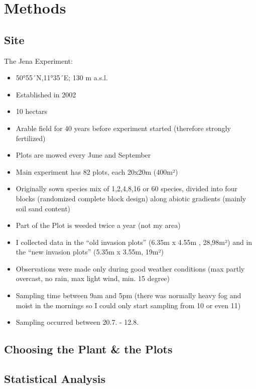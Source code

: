 \chapter{Methods}
\label{ch:methods}

\section{Site}

The Jena Experiment:

\begin{itemize}
\item	50°55´N,11°35´E; 130 m a.s.l.
\item	Established in 2002
\item	10 hectars
\item	Arable field for 40 years before experiment started (therefore strongly fertilized)
\item	Plots are mowed every June and September
\item	Main experiment has 82 plots, each 20x20m (400m²)
\item	Originally sown species mix of 1,2,4,8,16 or 60 species, divided into four blocks (randomized complete block design) along abiotic gradients (mainly soil sand content)
\item	Part of the Plot is weeded twice a year (not my area)
\item	I collected data in the “old invasion plots” (6.35m x 4.55m , 28,98m²) and in the “new invasion plots” (5.35m x 3.55m, 19m²)
\item	Observations were made only during good weather conditions (max partly overcast, no rain, max light wind, min. 15 degree)
\item	Sampling time between 9am and 5pm (there was normally heavy fog and moist in the mornings so I could only start sampling from 10 or even 11)
\item	Sampling occurred between 20.7. -  12.8.
\end{itemize}

\section{Choosing the Plant & the Plots}





\section{Statistical Analysis}

  
